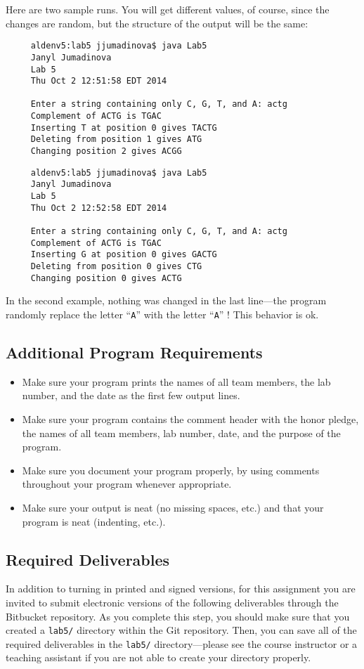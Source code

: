 Here are two sample runs. You will get different values, of course, since the
changes are random, but the structure of the output will be the same:
\begin{verbatim}
     aldenv5:lab5 jjumadinova$ java Lab5
     Janyl Jumadinova
     Lab 5
     Thu Oct 2 12:51:58 EDT 2014
     
     Enter a string containing only C, G, T, and A: actg
     Complement of ACTG is TGAC
     Inserting T at position 0 gives TACTG
     Deleting from position 1 gives ATG
     Changing position 2 gives ACGG
\end{verbatim}
\begin{verbatim}     
     aldenv5:lab5 jjumadinova$ java Lab5
     Janyl Jumadinova
     Lab 5
     Thu Oct 2 12:52:58 EDT 2014

     Enter a string containing only C, G, T, and A: actg
     Complement of ACTG is TGAC
     Inserting G at position 0 gives GACTG
     Deleting from position 0 gives CTG
     Changing position 0 gives ACTG
\end{verbatim}

In the second example, nothing was changed in the last line---the program 
randomly replace the letter ``{\tt A}'' with the letter ``{\tt A}'' !
This behavior is ok.

\vspace{-0.05in}
\subsection*{Additional Program Requirements}
\vspace{-0.05in}
\begin{itemize}
\item Make sure your program prints the names of all team members, the lab number, and the date as the first few output lines. 
\item Make sure your program contains the comment header with the honor pledge, the names of all team members, lab number, date, and the purpose of the program. 
\item Make sure you document your program properly, by using comments throughout your program whenever appropriate. 
\item Make sure your output
is neat (no missing spaces, etc.) and that your program is neat (indenting, etc.).
\end{itemize}

\vspace{-0.05in}
\subsection*{Required Deliverables}
\vspace{-0.05in}
In addition to turning in printed and signed versions, for this assignment you are invited to submit electronic versions of the following deliverables through the Bitbucket repository. As you complete this step, you should make sure that you
created a {\tt lab5/} directory within the Git repository.  Then, you can save all of the required deliverables in the
{\tt lab5/} directory---please see the course instructor or a teaching assistant if you are not able to create your
directory properly. 

